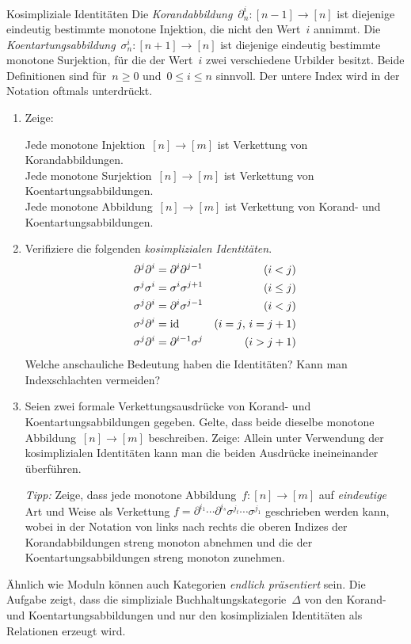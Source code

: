 \documentclass{uebblatt}
\begin{document}
\begin{aufgabe}{Kosimpliziale Identitäten}
Die \emph{Korandabbildung}~$\partial^i_n : [n-1] \to
[n]$ ist diejenige eindeutig bestimmte monotone Injektion, die nicht den
Wert~$i$ annimmt. Die \emph{Koentartungsabbildung}~$\sigma^i_n : [n+1] \to [n]$
ist diejenige eindeutig bestimmte monotone Surjektion, für die der Wert~$i$
zwei verschiedene Urbilder besitzt. Beide Definitionen sind für~$n \geq 0$
und~$0 \leq i \leq n$ sinnvoll. Der untere Index wird in der Notation oftmals
unterdrückt.
\begin{enumerate}
\item Zeige:

Jede monotone Injektion~\tabto{4.55cm}$[n] \to [m]$ ist Verkettung
von Korandabbildungen. \\
Jede monotone Surjektion~\tabto{4.55cm}$[n] \to [m]$ ist
Verkettung von Koentartungsabbildungen. \\
Jede monotone Abbildung~\tabto{4.55cm}$[n] \to [m]$
ist Verkettung von Korand- und Koentartungsabbildungen.

\item Verifiziere die folgenden \emph{kosimplizialen Identitäten}.
\begin{align*}
  \partial^j \partial^i &= \partial^i \partial^{j-1} & \text{($i < j$)} \\
  \sigma^j \sigma^i &= \sigma^i \sigma^{j+1} & \text{($i \leq j$)} \\
  \sigma^j \partial^i &= \partial^i \sigma^{j-1} & \text{($i < j$)} \\
  \sigma^j \partial^i &= \mathrm{id} & \text{($i = j$, $i = j+1$)} \\
  \sigma^j \partial^i &= \partial^{i-1} \sigma^j & \text{($i > j + 1$)} 
\end{align*}
Welche anschauliche Bedeutung haben die Identitäten? Kann man
Indexschlachten vermeiden?

\item Seien zwei formale Verkettungsausdrücke von Korand- und
Koentartungsabbildungen gegeben. Gelte, dass beide dieselbe monotone
Abbildung~$[n] \to [m]$ beschreiben. Zeige: Allein unter Verwendung der
kosimplizialen Identitäten kann man die beiden Ausdrücke ineineinander
überführen.

{\tiny\emph{Tipp:} Zeige, dass jede monotone Abbildung~$f : [n] \to [m]$ auf
\emph{eindeutige} Art und Weise als Verkettung
$f = \partial^{i_1} \cdots \partial^{i_s} \sigma^{j_t} \cdots \sigma^{j_1}$
geschrieben werden kann, wobei in der Notation von links nach rechts die oberen
Indizes der Korandabbildungen streng monoton abnehmen und die der
Koentartungsabbildungen streng monoton zunehmen.\par}
\end{enumerate}

Ähnlich wie Moduln können auch Kategorien \emph{endlich präsentiert} sein.
Die Aufgabe zeigt, dass die simpliziale Buchhaltungskategorie~$\Delta$ von
den Korand- und Koentartungsabbildungen und nur den kosimplizialen Identitäten als
Relationen erzeugt wird.
\end{aufgabe}
\end{document}
